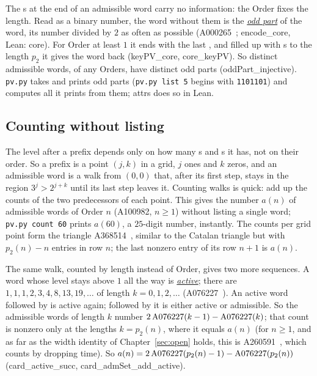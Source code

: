 \documentclass[11pt,a4paper,titlepage]{article}
\makeatletter
\newcommand{\termhere}[1]{\leavevmode
  \Hy@raisedlink{\hyper@anchorstart{term:#1}\hyper@anchorend}}
\newcommand{\keyterm}[2]{\hyperlink{box:#1}{\emph{#2}}}
\newcommand{\keysym}[2]{\hyperlink{box:#1}{#2}}
\newcommand{\lean}[1]{\textsf{#1}}
\newcommand{\pv}[1]{\texttt{pv.py #1}}
\makeatother
\begin{document}
\termhere{oddpart}The s at the end of an admissible word carry no information: the Order
fixes the length. Read as a binary number, the word without them is the \keyterm{oddpart}{odd part}
of the word, its number divided by $2$ as often as possible
(A000265~\cite{OEIS_A000265}; \lean{encode\_core}, Lean: \lean{core}). For Order at
least $1$ it ends with the last , and filled up with s to the length $p_2$ it
gives the word back (\lean{keyPV\_core}, \lean{core\_keyPV}). So distinct admissible words, of any
Orders, have distinct odd parts (\lean{oddPart\_injective}). \texttt{pv.py} takes and prints
odd parts (\pv{list 5} begins with \texttt{1101101}) and computes all it prints from them;
\lean{attrs} does so in Lean.

\subsection*{Counting without listing}

The level after a prefix depends only on how many s and s it has, not on
their order. So a prefix is a point $(j,k)$ in a grid, $j$ ones and $k$ zeros,
and an admissible word is a walk from $(0,0)$ that, after its first step, stays in the region
$3^j > 2^{j+k}$ until its last step leaves it. \termhere{an}Counting walks is quick: add up
the counts of the two predecessors of each point. This gives
the number \keysym{an}{$a(n)$} of admissible words of Order $n$ (A100982, $n \ge 1$) without listing a single word; \pv{count 60} prints $a(60)$,
a $25$-digit number, instantly. The counts per grid point form the triangle
A368514~\cite{OEIS_A368514}, similar to the Catalan triangle but with $p_2(n) - n$
entries in row $n$; the last nonzero entry of its row $n+1$ is $a(n)$.

\nopagebreak
The same walk, counted by length instead of Order, gives two more sequences.
\termhere{active}A word whose level stays above $1$ all the way is \keyterm{active}{active}; there are
$1, 1, 1, 2, 3, 4, 8, 13, 19, \dots$ of length $k = 0, 1, 2, \dots$
(A076227~\cite{OEIS_A076227}). An active word followed by  is active again;
followed by  it is either active or admissible. So the admissible words of
length $k$ number $2\,\mathrm{A076227}\index{OEIS!A076227}(k-1) - \mathrm{A076227}\index{OEIS!A076227}(k)$; that count is nonzero only at
the lengths $k = p_2(n)$, where it equals $a(n)$ (for $n \ge 1$, and as far as the
width identity of Chapter~\ref{sec:open} holds, this is
A260591~\cite{OEIS_A260591}, which counts by dropping time).
So $a(n) = 2\,\mathrm{A076227}\index{OEIS!A076227}(p_2(n)-1) - \mathrm{A076227}\index{OEIS!A076227}(p_2(n))$ (\lean{card\_active\_succ},
\lean{card\_admSet\_add\_active}).
\end{document}
